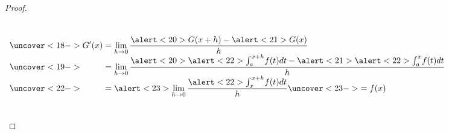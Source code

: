 \begin{frame}
\begin{proof}[Proof]
\begin{columns}
{\[
\begin{array}{l}
\uncover<18->{\displaystyle G'(x)=\lim\limits_{h\to 0}\frac{ \alert<20>{ G(x+h)} -\alert<21>{G(x)}}{h} }\\ 
\uncover<19->{\displaystyle \phantom{ G'(x) }= \lim\limits_{h\to 0}  \frac{ \alert<20>{ \alert<22>{\int_{a}^{x+h}} f(t)dt} - \alert<21>{ \alert<22>{\int_{a}^{x}} f(t)dt}}{h} }\\
\uncover<22->{\displaystyle \phantom{ G'(x) }= \alert<23>{\lim\limits_{h\to 0}\frac{\alert<22>{\int_{x}^{x+h}}f(t)dt }{h} \uncover<23->{=f(x)}}}
\end{array}
\]

}
\end{columns}
\end{proof} 
\end{frame}
